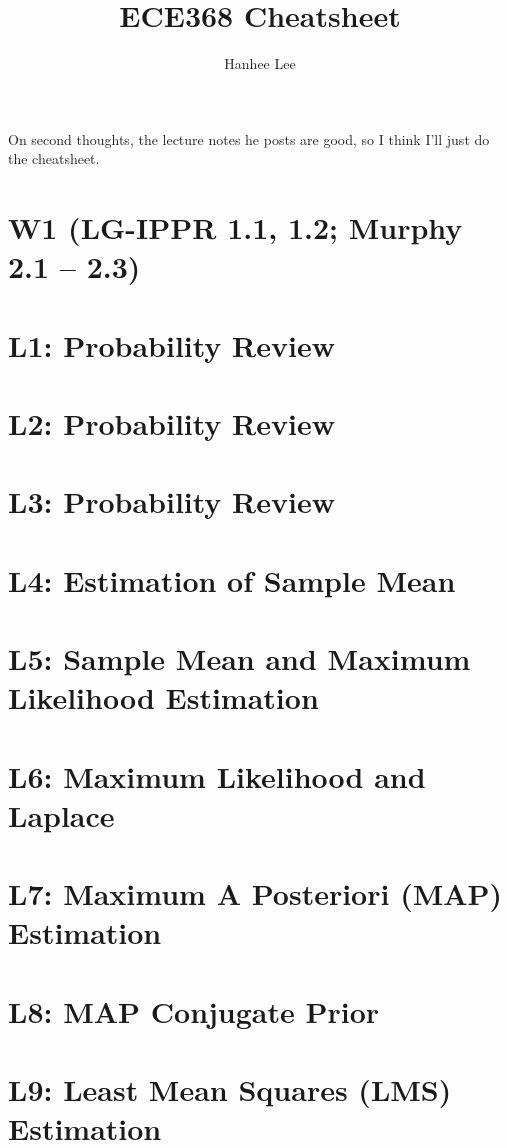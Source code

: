 \documentclass[twoside]{article}
\title{ECE368 Cheatsheet}
\author{Hanhee Lee}
\begin{document}
\maketitle

\tableofcontents

\begin{summary}
    On second thoughts, the lecture notes he posts are good, so I think I'll just do the cheatsheet. 
\end{summary}
\section*{W1 (LG-IPPR 1.1, 1.2; Murphy 2.1 – 2.3)}
\section{L1: Probability Review}

\newpage

\section{L2: Probability Review}

\newpage

\section{L3: Probability Review}

\cleardoublepage

\section{L4: Estimation of Sample Mean}

\newpage

\section{L5: Sample Mean and Maximum Likelihood Estimation}

\newpage

\section{L6: Maximum Likelihood and Laplace}

\newpage

\section{L7: Maximum A Posteriori (MAP) Estimation} 

\newpage

\section{L8: MAP Conjugate Prior}
 
\newpage

\section{L9: Least Mean Squares (LMS) Estimation}
 
\newpage
\end{document}
